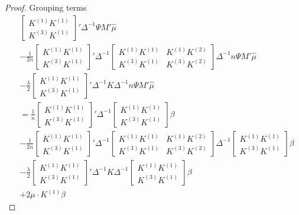 \begin{proof}
Grouping terms
\begin{align}
    &\begin{bmatrix}K^{(1)}K^{(1)} \\ K^{(3)}K^{(1)} \end{bmatrix}'\Delta^{-1}\Psi M'\hat{\mu} \\
    &-\frac{1}{2n}\begin{bmatrix}K^{(1)}K^{(1)} \\ K^{(3)}K^{(1)} \end{bmatrix}'    
\Delta^{-1}
       \begin{bmatrix} K^{(1)}K^{(1)} & K^{(1)} K^{(2)} \\ K^{(3)} K^{(1)} & K^{(3)}K^{(2)}\end{bmatrix}
        \Delta^{-1}
        n\Psi M' \hat{\mu}  \\
    &-\frac{\lambda}{2}\begin{bmatrix}K^{(1)}K^{(1)} \\ K^{(3)}K^{(1)} \end{bmatrix}'   
\Delta^{-1}
       K
        \Delta^{-1}
        n\Psi M' \hat{\mu} \\
    &= 
    \frac{1}{n} \begin{bmatrix} K^{(1)} K^{(1)} \\ K^{(3)} K^{(1)}\end{bmatrix}'\Delta^{-1}\begin{bmatrix} K^{(1)} K^{(1)} \\ K^{(3)} K^{(1)}\end{bmatrix}\beta
    \\
    &-\frac{1}{2n}\begin{bmatrix}K^{(1)}K^{(1)} \\ K^{(3)}K^{(1)} \end{bmatrix}'    
\Delta^{-1}
       \begin{bmatrix} K^{(1)}K^{(1)} & K^{(1)} K^{(2)} \\ K^{(3)} K^{(1)} & K^{(3)}K^{(2)}\end{bmatrix}
        \Delta^{-1}
        \begin{bmatrix}K^{(1)}K^{(1)} \\ K^{(3)}K^{(1)} \end{bmatrix} \beta  \\
    &-\frac{\lambda}{2}\begin{bmatrix}K^{(1)}K^{(1)} \\ K^{(3)}K^{(1)} \end{bmatrix}'   
\Delta^{-1}
       K
        \Delta^{-1}
        \begin{bmatrix}K^{(1)}K^{(1)} \\ K^{(3)}K^{(1)} \end{bmatrix} \beta \\
    &+2\mu\cdot K^{(1)}\beta
\end{align}


\end{proof}
